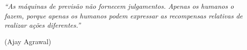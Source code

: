 







\begin{epigrafe}
    \vspace*{\fill}
    \begin{flushright}
	\begin{minipage}{.5\textwidth}
 
		\textit %
{``As máquinas de previsão não fornecem julgamentos. Apenas os humanos o fazem, porque apenas os humanos podem expressar as recompensas relativas de realizar ações diferentes.''}

		\begin{flushright} %
                (Ajay Agrawal)
            \end{flushright}
  
    \end{minipage}
    \end{flushright}
\end{epigrafe}
